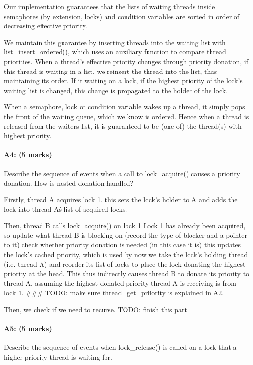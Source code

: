 Our implementation guarantees that the lists of waiting threads inside semaphores (by extension, locks) and condition variables are sorted in order of decreasing effective priority.

We maintain this guarantee by inserting threads into the waiting list with list\_insert\_ordered(), which uses an auxiliary function to compare thread priorities.
When a thread's effective priority changes through priority donation, if this thread is waiting in a list, we reinsert the thread into the list, thus maintaining its order. If it waiting on a lock, if the highest priority of the lock's waiting list is changed, this change is propagated to the holder of the lock.

When a semaphore, lock or condition variable wakes up a thread, it simply pops the front of the waiting queue, which we know is ordered. Hence when a thread is released from the waiters list, it is guaranteed to be (one of) the thread(s) with highest priority.

\paragraph{A4: (5 marks)}
Describe the sequence of events when a call to lock\_acquire() causes a priority donation.  How is nested donation handled?

  Firstly, thread A acquires lock 1.
    this sets the lock's holder to A and adds the lock into thread A\'s list of acquired locks.

  Then, thread B calls lock\_acquire() on lock 1
  Lock 1 has already been acquired, so
    update what thread B is blocking on (record the type of blocker and a pointer to it)
    check whether priority donation is needed (in this case it is)
      this updates the lock's cached priority, which is used by 
    now we take the lock's holding thread (i.e. thread A) and reorder its list of locks to place the lock donating the highest priority at the head. This thus indirectly causes thread B to donate its priority to thread A, assuming the highest donated priority thread A is receiving is from lock 1.
    \#\#\# TODO: make sure thread\_get\_priiority is explained in A2.

    Then, we check if we need to recurse. TODO: finish this part

\paragraph{A5: (5 marks)}
Describe the sequence of events when lock\_release() is called on a lock that a higher-priority thread is waiting for.

